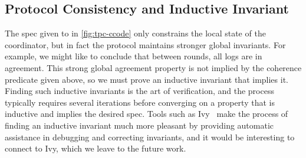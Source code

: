 \subsection{Protocol Consistency and Inductive Invariant}
\label{sec:cons-induct-invar}

The spec given to  in \cref{fig:tpc-ccode}
only constrains the local state  of the coordinator, but
in fact the protocol maintains stronger global invariants.
%
For example, we might like to conclude that between rounds, all logs
are in agreement.
%
This strong global agreement property is not implied by the coherence
predicate given above, so we must prove an inductive invariant that
implies it.
%
Finding such inductive invariants is the art of verification, and the
process typically requires several iterations before converging on a
property that is inductive and implies the desired spec.
%
Tools such as Ivy~\cite{Padon-al:PLDI16} make the process of finding
an inductive invariant much more pleasant by providing automatic
assistance in debugging and correcting invariants, and it would be
interesting to connect \disel to Ivy, which we leave to the future work.

